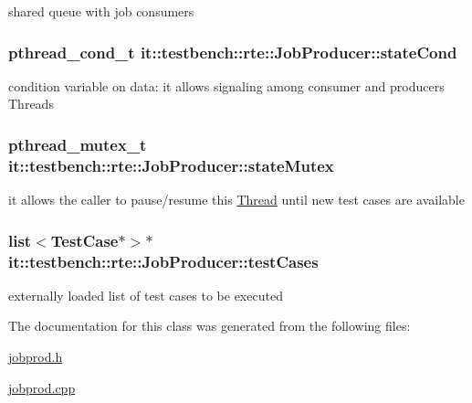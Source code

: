 shared queue with job consumers \hypertarget{classit_1_1testbench_1_1rte_1_1JobProducer_a338c98f3baf25a38aac0b61052654d01}{
\subsubsection[{state\-Cond}]{\setlength{\rightskip}{0pt plus 5cm}pthread\-\_\-cond\-\_\-t it\-::testbench\-::rte\-::\-Job\-Producer\-::state\-Cond\hspace{0.3cm}{\ttfamily [private]}}}\label{de/d4e/classit_1_1testbench_1_1rte_1_1JobProducer_a338c98f3baf25a38aac0b61052654d01}
condition variable on data\-: it allows signaling among consumer and producers Threads \hypertarget{classit_1_1testbench_1_1rte_1_1JobProducer_a057bd5b0f3f2debd4d4decedd97a3dde}{
\subsubsection[{state\-Mutex}]{\setlength{\rightskip}{0pt plus 5cm}pthread\-\_\-mutex\-\_\-t it\-::testbench\-::rte\-::\-Job\-Producer\-::state\-Mutex\hspace{0.3cm}{\ttfamily [private]}}}\label{de/d4e/classit_1_1testbench_1_1rte_1_1JobProducer_a057bd5b0f3f2debd4d4decedd97a3dde}
it allows the caller to pause/resume this \hyperlink{classit_1_1testbench_1_1rte_1_1Thread}{Thread} until new test cases are available \hypertarget{classit_1_1testbench_1_1rte_1_1JobProducer_a04ec295961ab5dcc1c8caadf6cb30e46}{
\subsubsection[{test\-Cases}]{\setlength{\rightskip}{0pt plus 5cm}list$<${\bf Test\-Case}$\ast$$>$$\ast$ it\-::testbench\-::rte\-::\-Job\-Producer\-::test\-Cases\hspace{0.3cm}{\ttfamily [private]}}}\label{de/d4e/classit_1_1testbench_1_1rte_1_1JobProducer_a04ec295961ab5dcc1c8caadf6cb30e46}
externally loaded list of test cases to be executed 

The documentation for this class was generated from the following files\-:\begin{DoxyCompactItemize}
\item 
\hyperlink{jobprod_8h}{jobprod.\-h}\item 
\hyperlink{jobprod_8cpp}{jobprod.\-cpp}\end{DoxyCompactItemize}
